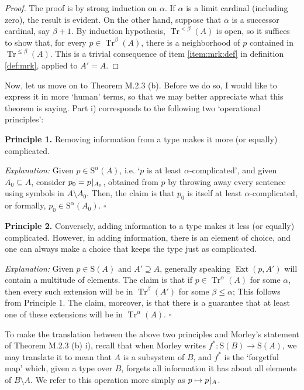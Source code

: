 \documentclass{article}
\theoremstyle{nonumberplain}
\newtheorem{proof}{Proof}
\newcommand{\Stone}{\mathrm{S}}
\DeclareMathOperator{\Tr}{Tr}
\DeclareMathOperator{\Ext}{Ext}
\newcommand{\rst}[2]{#1\mspace{1.3mu plus 0.5mu minus 0.5mu}|_{#2}}
\begin{document}
\begin{proof}
The proof is by strong induction on $\alpha$. If $\alpha$ is a limit cardinal (including zero), the result is evident. On the other hand, suppose that $\alpha$ is a successor cardinal, say $\beta + 1$. By induction hypothesis, $\Tr^{<\beta}(A)$ is open, so it suffices to show that, for every $p \in \Tr^\beta(A)$, there is a neighborhood of $p$ contained in $\Tr^{\leq\beta}(A)$. This is a trivial consequence of item \ref{item:mrk:def} in definition \ref{def:mrk}, applied to $A' = A$.
\end{proof}

Now, let us move on to Theorem M.2.3 (b). Before we do so, I would like to express it in more `human' terms, so that we may better appreciate what this theorem is saying. Part i) corresponds to the following two `operational principles':

\medskip

\textbf{Principle 1.} Removing information from a type makes it more (or equally) complicated.

\smallskip

\textit{Explanation:} Given $p \in \Stone^\alpha(A)$, i.e. `$p$ is at least $\alpha$-complicated', and given $A_0 \subseteq A$, consider $p_0 = \rst p{A_0}$, obtained from $p$ by throwing away every sentence using symbols in $A \setminus A_0$. Then, the claim is that $p_0$ is itself at least $\alpha$-complicated, or formally, $p_0 \in \Stone^\alpha(A_0)$. \hfill $\square$

\medskip

\textbf{Principle 2.} Conversely, adding information to a type makes it less (or equally) complicated. However, in adding information, there is an element of choice, and one can always make a choice that keeps the type just as complicated.

\smallskip

\textit{Explanation:} Given $p \in \Stone(A)$ and $A' \supseteq A$, generally speaking $\Ext(p,A')$ will contain a multitude of elements. The claim is that if $p \in \Tr^\alpha(A)$ for some $\alpha$, then every such extension will be in $\Tr^\beta(A')$ for some $\beta\leq\alpha$; This follows from Principle 1. The claim, moreover, is that there is a guarantee that at least one of these extensions will be in $\Tr^\alpha(A)$. \hfill $\square$

\medskip

To make the translation between the above two principles and Morley's statement of Theorem M.2.3 (b) i), recall that when Morley writes $f^* \colon \Stone(B) \to \Stone(A)$, we may translate it to mean that $A$ is a subsystem of $B$, and $f^*$ is the `forgetful map' which, given a type over $B$, forgets all information it has about all elements of $B \setminus A$. We refer to this operation more simply as $p \mapsto \rst pA$.
\end{document}
